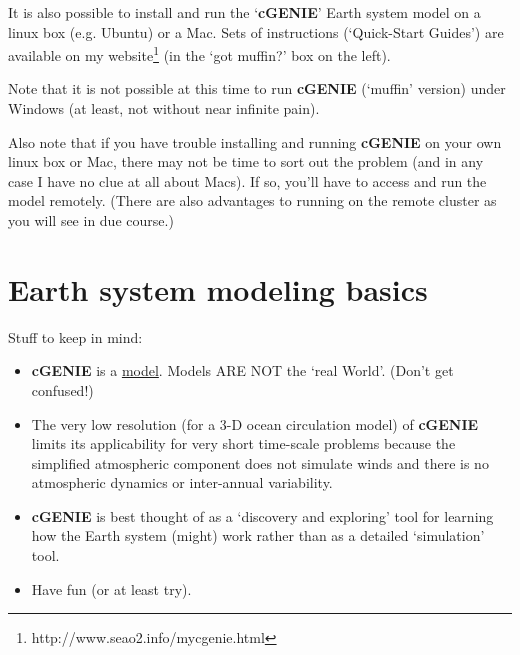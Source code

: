 \documentclass[11pt,fleqn]{book} %
\begin{document}
It is also possible to install and run the ‘\textbf{cGENIE}’ Earth system model on a linux box (e.g. Ubuntu) or a Mac. Sets of instructions (‘Quick-Start Guides’) are available on my website\footnote{http://www.seao2.info/mycgenie.html} (in the ‘got muffin?’ box on the left).

Note that it is not possible at this time to run \textbf{cGENIE} (‘muffin’ version) under Windows (at least, not without near infinite pain).

Also note that if you have trouble installing and running \textbf{cGENIE} on your own linux box or Mac, there may not be time to sort out the problem (and in any case I have no clue at all about Macs). If so, you’ll have to access and run the model remotely. (There are also advantages to running on the remote cluster as you will see in due course.)



\cleardoublepage


\chapter{Earth system modeling basics}

\hfill \break

\noindent Stuff to keep in mind:

\begin{itemize}
\item \textbf{cGENIE} is a \uline{model}. Models ARE NOT the ‘real World’. (Don’t get confused!)
\item The very low resolution (for a 3-D ocean circulation model) of \textbf{cGENIE} limits its applicability for very short time-scale problems because the simplified atmospheric component does not simulate winds and there is no atmospheric dynamics or inter-annual variability.
\item \textbf{cGENIE} is best thought of as a ‘discovery and exploring’ tool for learning how the Earth system (might) work rather than as a detailed ‘simulation’ tool.
\item Have fun (or at least try).
\end{itemize}
   
\end{document}
